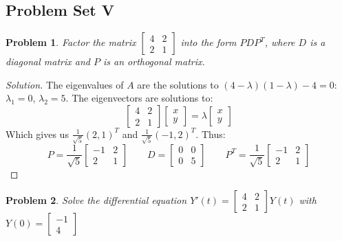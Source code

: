 \documentclass[oneside]{book}
\theoremstyle{mystyle}
\newtheorem{problem}{Problem}[section]
\begin{document}
\subsection{Problem Set V}
\begin{problem}
Factor the matrix $\begin{bmatrix} 4 & 2 \\ 2 & 1 \end{bmatrix}$ into the form $PDP^T$, where $D$ is a diagonal matrix and $P$ is an orthogonal matrix.
\end{problem}
\begin{proof}[Solution]
The eigenvalues of $A$ are the solutions to $(4-\lambda)(1-\lambda)-4=0$: $\lambda_1 = 0$, $\lambda_2 = 5$. The eigenvectors are solutions to:
\begin{equation*}
    \begin{bmatrix} 4 & 2 \\ 2 & 1 \end{bmatrix} \begin{bmatrix} x \\ y \end{bmatrix} = \lambda \begin{bmatrix} x \\ y \end{bmatrix}
\end{equation*}
Which gives us $\frac{1}{\sqrt{5}}(2,1)^T$ and $\frac{1}{\sqrt{5}}(-1,2)^T$. Thus:
\begin{equation*}
    P = \frac{1}{\sqrt{5}}\begin{bmatrix} -1 & 2 \\ 2 & 1 \end{bmatrix}\quad\quad D = \begin{bmatrix} 0 & 0 \\ 0 & 5 \end{bmatrix}\quad\quad P^{T} = \frac{1}{\sqrt{5}}\begin{bmatrix} -1 & 2 \\ 2 & 1 \end{bmatrix}
\end{equation*}
\end{proof}
\begin{problem}
Solve the differential equation $Y'(t) = \begin{bmatrix} 4 & 2 \\ 2 & 1 \end{bmatrix} Y(t)$ with $Y(0) = \begin{bmatrix} -1 \\ 4 \end{bmatrix}$
\end{problem}
\end{document}
